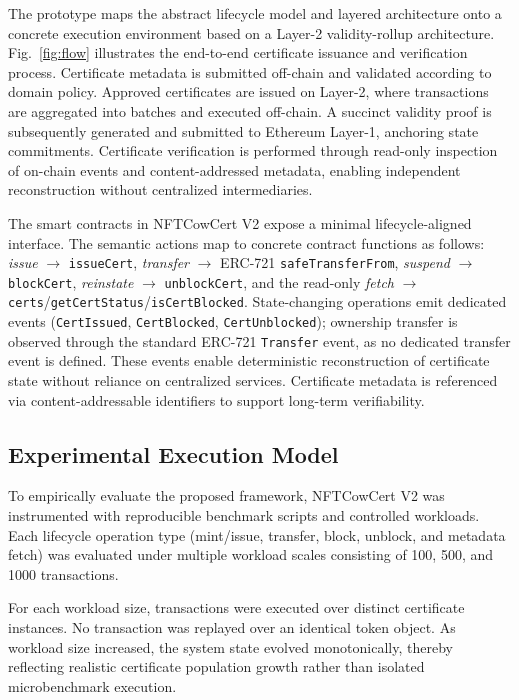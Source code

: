 \documentclass[pdflatex,sn-mathphys-num]{sn-jnl}
\begin{document}
The prototype maps the abstract lifecycle model and layered architecture onto a concrete execution environment based on a Layer-2 validity-rollup architecture. Fig.~\ref{fig:flow} illustrates the end-to-end certificate issuance and verification process. Certificate metadata is submitted off-chain and validated according to domain policy. Approved certificates are issued on Layer-2, where transactions are aggregated into batches and executed off-chain. A succinct validity proof is subsequently generated and submitted to Ethereum Layer-1, anchoring state commitments. Certificate verification is performed through read-only inspection of on-chain events and content-addressed metadata, enabling independent reconstruction without centralized intermediaries.

The smart contracts in NFTCowCert V2 expose a minimal lifecycle-aligned interface. The semantic actions map to concrete contract functions as follows: \textit{issue} $\rightarrow$ \texttt{issueCert}, \textit{transfer} $\rightarrow$ ERC-721 \texttt{safeTransferFrom}, \textit{suspend} $\rightarrow$ \texttt{blockCert}, \textit{reinstate} $\rightarrow$ \texttt{unblockCert}, and the read-only \textit{fetch} $\rightarrow$ \texttt{certs}/\texttt{getCertStatus}/\texttt{isCertBlocked}. State-changing operations emit dedicated events (\texttt{CertIssued}, \texttt{CertBlocked}, \texttt{CertUnblocked}); ownership transfer is observed through the standard ERC-721 \texttt{Transfer} event, as no dedicated transfer event is defined. These events enable deterministic reconstruction of certificate state without reliance on centralized services. Certificate metadata is referenced via content-addressable identifiers to support long-term verifiability.

\subsection{Experimental Execution Model}

To empirically evaluate the proposed framework, NFTCowCert V2 was instrumented with reproducible benchmark scripts and controlled workloads. Each lifecycle operation type (mint/issue, transfer, block, unblock, and metadata fetch) was evaluated under multiple workload scales consisting of 100, 500, and 1000 transactions.

For each workload size, transactions were executed over distinct certificate instances. No transaction was replayed over an identical token object. As workload size increased, the system state evolved monotonically, thereby reflecting realistic certificate population growth rather than isolated microbenchmark execution.
\end{document}
